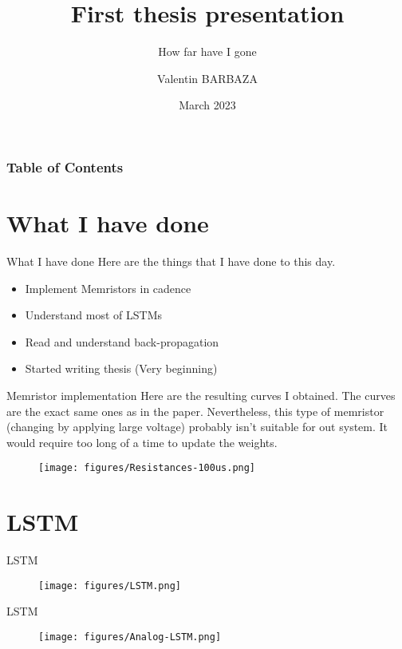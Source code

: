 \documentclass{beamer}
\title[Thesis 1]
{First thesis presentation}
\subtitle{How far have I gone}
\author[V. BARBAZA]{Valentin BARBAZA}
\date[2023] %
{March 2023}
\begin{document}
\frame{\titlepage}

\begin{frame}
  \frametitle{Table of Contents}
  \tableofcontents
\end{frame}

\section{What I have done}

\begin{frame}{What I have done}
  Here are the things that I have done to this day.
  \begin{itemize}
    \item Implement Memristors in cadence
    \item Understand most of LSTMs
    \item Read and understand back-propagation
    \item Started writing thesis (Very beginning)
  \end{itemize}
\end{frame}

\begin{frame}{Memristor implementation}
  Here are the resulting curves I obtained. The curves are the exact same ones as in the paper. Nevertheless, this type of memristor (changing by applying large voltage) probably isn't suitable for out system. It would require too long of a time to update the weights.
  \begin{figure}
    \texttt{[image: figures/Resistances-100us.png]}
  \end{figure}
\end{frame}

\section{LSTM}
\begin{frame}{LSTM}
  \begin{figure}
    \centering
    \texttt{[image: figures/LSTM.png]}
  \end{figure}
\end{frame}
\begin{frame}{LSTM}
  \begin{figure}
    \centering
    \texttt{[image: figures/Analog-LSTM.png]}
  \end{figure}

\end{frame}
\end{document}
